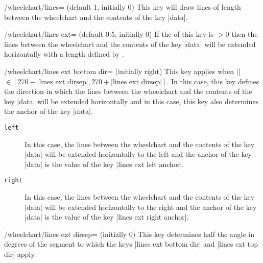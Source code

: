 \documentclass[a4paper,english,dvipsnames]{ltxdoc}
\begin{document}
\begin{key}{/wheelchart/lines= (default 1, initially 0)}
This key will draw lines of length  between the wheelchart and the contents of the key |data|.
\begin{codeexample}[width=10cm]
\end{codeexample}
\end{key}
\begin{key}{/wheelchart/lines ext= (default 0.5, initially 0)}
If the  of this key is $>0$ then the lines between the wheelchart and the contents of the key |data| will be extended horizontally with a length defined by 	.
\end{key}
\begin{key}{/wheelchart/lines ext bottom dir= (initially right)}
This key applies when |\WCdataangle|${}\in[270-\text{|lines ext dirsep|},270+\text{|lines ext dirsep|}]$. In this case, this key defines the direction in which the lines between the wheelchart and the contents of the key |data| will be extended horizontally and in this case, this key also determines the anchor of the key |data|.
\begin{description}
\item[\texttt{left}] In this case, the lines between the wheelchart and the contents of the key |data| will be extended horizontally to the left and the anchor of the key |data| is the value of the key |lines ext left anchor|.
\item[\texttt{right}] In this case, the lines between the wheelchart and the contents of the key |data| will be extended horizontally to the right and the anchor of the key |data| is the value of the key |lines ext right anchor|.
\end{description}
\end{key}
\begin{key}{/wheelchart/lines ext dirsep= (initially 0)}
This key determines half the angle in degrees of the segment to which the keys |lines ext bottom dir| and |lines ext top dir| apply.
\end{key}
\end{document}
